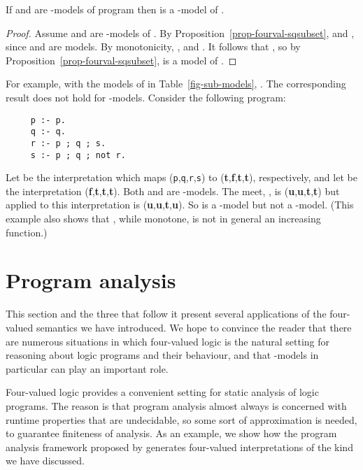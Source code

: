 \documentclass{tlp}
\begin{document}
\begin{proposition} \rm
\label{prop-mod-meet}
If  and  are -models of program  then  is a
-model of .
\end{proposition}
\begin{proof}
Assume  and  are -models of .
By Proposition~\ref{prop-fourval-sqsubset},
 and , since  and 
are models.  
By monotonicity, ,
and .
It follows that
, 
so by Proposition~\ref{prop-fourval-sqsubset}, 
 is a model of .
\end{proof}
For example, with the models of  in Table~\ref{fig-sub-models},
.
The corresponding result does not hold for -models. 
Consider the following program:
\begin{verbatim}
     p :- p.
     q :- q.
     r :- p ; q ; s.
     s :- p ; q ; not r.
\end{verbatim}
Let  be the interpretation
which maps (\texttt{p},\texttt{q},\texttt{r},\texttt{s}) to
(\textbf{t},\textbf{f},\textbf{t},\textbf{t}), respectively, and let 
be the interpretation (\textbf{f},\textbf{t},\textbf{t},\textbf{t}).
Both  and  are -models.  The meet, , is
(\textbf{u},\textbf{u},\textbf{t},\textbf{t}) but  applied to
this interpretation is (\textbf{u},\textbf{u},\textbf{t},\textbf{u}).
So  is a -model but not a -model.
(This example also shows that , while monotone, is not
in general an increasing function.)


\section{Program analysis}
\label{sec-proganalysis}

This section and the three that follow it present several applications 
of the four-valued semantics we have introduced.
We hope to convince the reader that there are numerous situations
in which four-valued logic is the natural setting for reasoning about
logic programs and their behaviour, and that -models in
particular can play an important role.

Four-valued logic provides a convenient setting for static analysis
of logic programs.
The reason is that program analysis almost always is concerned with
runtime properties that are undecidable, so some sort of
approximation is needed, to guarantee finiteness of analysis.
As an example, we show how the program analysis framework proposed by
 generates four-valued interpretations of the kind
we have discussed.
\end{document}
